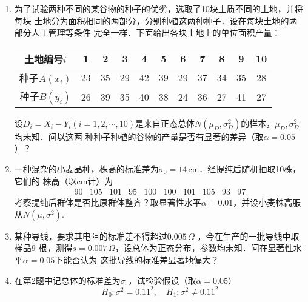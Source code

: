 \documentclass[10pt,a4paper]{article}
\begin{document}
\begin{enumerate}
    \item 为了试验两种不同的某谷物的种子的优劣，选取了10块土质不同的土地，并将每块
    土地分为面积相同的两部分，分别种植这两种种子．设在每块土地的两部分人工管理等条件
    完全一样．下面给出各块土地上的单位面积产量：
    \renewcommand{\arraystretch}{1.3}
    \begin{table}[H]\centering
        \begin{tabular}{c|cccccccccc}
        \hline
        土地编号$i$    & 1  & 2  & 3  & 4  & 5  & 6  & 7  & 8  & 9  & 10 \\ \hline
        种子$A(x_i)$ & 23 & 35 & 29 & 42 & 39 & 29 & 37 & 34 & 35 & 28 \\ \hline
        种子$B(y_i)$ & 26 & 39 & 35 & 40 & 38 & 24 & 36 & 27 & 41 & 27 \\ \hline
        \end{tabular}
    \end{table}
    \renewcommand{\arraystretch}{1.0}
    设$D_i=X_i-Y_i(i=1,2,\cdots,10)$是来自正态总体$N(\mu_D,\sigma^2_D)$的样本，$\mu_D,\sigma^2_D$均未知．问以这两
    种种子种植的谷物的产量是否有显著的差异（取$\alpha=0.05$）？
    \clearpage



    \item 一种混杂的小麦品种，株高的标准差为$\sigma_0=14\, \mathrm{cm}$．经提纯后随机抽取10株，它们的
    株高（以cm计）为
    $$\begin{array}{cccccccccc}
        90 & 105 & 101 & 95  & 100 & 100 & 101 & 105 &  93 & 97
    \end{array}$$
    考察提纯后群体是否比原群体整齐？取显著性水平$\alpha=0.01$，并设小麦株高服从$N(\mu,\sigma^2)$.
    \clearpage



    \item 某种导线，要求其电阻的标准差不得超过$0.005\, \Omega$ ，今在生产的一批导线中取样品9
    根，测得$s=0.007\, \Omega$，设总体为正态分布，参数均未知．问在显著性水平$\alpha=0.05$下能否认为
    这批导线的标准差显著地偏大？
    \clearpage


    \item 在第2题中记总体的标准差为$\sigma$ ，试检验假设（取$\alpha=0.05$）
    $$H_0:\sigma^2=0.11^2,\quad H_1:\sigma^2\neq 0.11^2$$


\end{enumerate}
\end{document}
